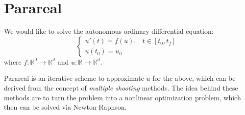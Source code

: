 \section{Parareal}

We would like to solve the autonomous ordinary differential equation:
\begin{equation*}
  \begin{cases}
    u'(t) = f(u), & t \in [t_0, t_f] \\
    u(t_0) = u_0
  \end{cases}
\end{equation*}
where $f : \mathbb{R}^d \to \mathbb{R}^d$ and $u: \mathbb{R} \to \mathbb{R}^d$.

Parareal is an iterative scheme to approximate $u$ for the above, which can be
derived from the concept of \textit{multiple shooting} methods. The idea behind
these methods are to turn the problem into a nonlinear optimization problem,
which then can be solved via Newton-Raphson. \cite{gandervandewalle}

